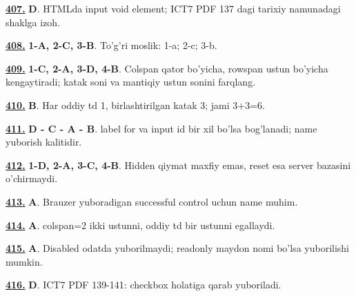 \documentclass[10pt,a4paper,oneside]{article}
\begin{document}
\par\vspace{3mm}
\noindent\hyperlink{q407}{\textbf{407.}} \textbf{D}.  HTMLda input void element; ICT7 PDF 137 dagi tarixiy namunadagi shaklga izoh.
\par\vspace{3mm}
\noindent\hyperlink{q408}{\textbf{408.}} \textbf{1-A, 2-C, 3-B}.  To'g'ri moslik: 1-a; 2-c; 3-b.
\par\vspace{3mm}
\noindent\hyperlink{q409}{\textbf{409.}} \textbf{1-C, 2-A, 3-D, 4-B}.  Colspan qator bo'yicha, rowspan ustun bo'yicha kengaytiradi; katak soni va mantiqiy ustun sonini farqlang.
\par\vspace{3mm}
\noindent\hyperlink{q410}{\textbf{410.}} \textbf{B}.  Har oddiy td 1, birlashtirilgan katak 3; jami 3+3=6.
\par\vspace{3mm}
\noindent\hyperlink{q411}{\textbf{411.}} \textbf{D - C - A - B}.  label for va input id bir xil bo'lsa bog'lanadi; name yuborish kalitidir.
\par\vspace{3mm}
\noindent\hyperlink{q412}{\textbf{412.}} \textbf{1-D, 2-A, 3-C, 4-B}.  Hidden qiymat maxfiy emas, reset esa server bazasini o'chirmaydi.
\par\vspace{3mm}
\noindent\hyperlink{q413}{\textbf{413.}} \textbf{A}.  Brauzer yuboradigan successful control uchun name muhim.
\par\vspace{3mm}
\noindent\hyperlink{q414}{\textbf{414.}} \textbf{A}.  colspan=2 ikki ustunni, oddiy td bir ustunni egallaydi.
\par\vspace{3mm}
\noindent\hyperlink{q415}{\textbf{415.}} \textbf{A}.  Disabled odatda yuborilmaydi; readonly maydon nomi bo'lsa yuborilishi mumkin.
\par\vspace{3mm}
\noindent\hyperlink{q416}{\textbf{416.}} \textbf{D}.  ICT7 PDF 139-141: checkbox holatiga qarab yuboriladi.
\par\vspace{3mm}
\end{document}

